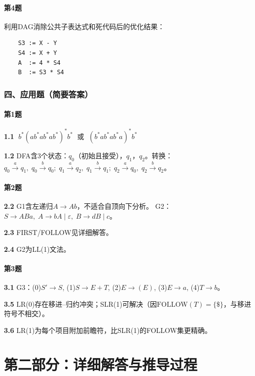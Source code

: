 \documentclass[12pt,a4paper,fontset=fandol]{ctexart}
\begin{document}
\subsection*{第4题}
利用DAG消除公共子表达式和死代码后的优化结果：
\begin{verbatim}
    S3 := X - Y
    S4 := X + Y
    A  := 4 * S4
    B  := S3 * S4
\end{verbatim}

\section*{四、应用题（简要答案）}

\subsection*{第1题}
\textbf{1.1} $\; b^*(ab^*ab^*ab^*)^*b^* \;$ 或 $\; (b^*ab^*ab^*a)^*b^*$

\textbf{1.2} DFA含3个状态：$q_0$（初始且接受），$q_1$，$q_2$。转换：$q_0\xrightarrow{a}q_1,\; q_0\xrightarrow{b}q_0;\; q_1\xrightarrow{a}q_2,\; q_1\xrightarrow{b}q_1;\; q_2\xrightarrow{a}q_0,\; q_2\xrightarrow{b}q_2$。

\subsection*{第2题}
\textbf{2.2} G1含左递归$A \to Ab$，不适合自顶向下分析。
G2：$S \to ABa,\; A \to bA \mid \varepsilon,\; B \to dB \mid c$。

\textbf{2.3} FIRST/FOLLOW见详细解答。

\textbf{2.4} G2为LL(1)文法。

\subsection*{第3题}
\textbf{3.1} G3：(0)$S'\to S$, (1)$S\to E+T$, (2)$E\to (E)$, (3)$E\to a$, (4)$T\to b$。

\textbf{3.5} LR(0)存在移进--归约冲突；SLR(1)可解决（因$\text{FOLLOW}(T)=\{\$\}$，与移进符号不相交）。

\textbf{3.6} LR(1)为每个项目附加前瞻符，比SLR(1)的FOLLOW集更精确。


\newpage
\part*{第二部分：详细解答与推导过程}
\end{document}
